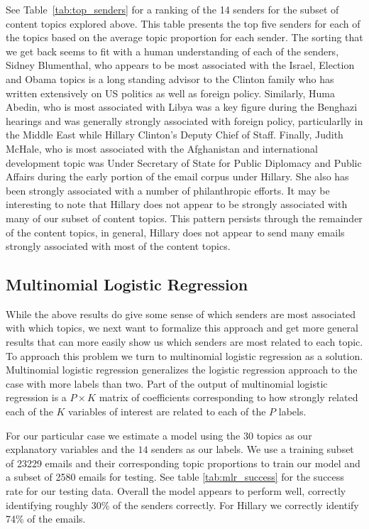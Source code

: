 \documentclass[12pt]{article}
\theoremstyle{definition}
\theoremstyle{algodesc}
\begin{document}
See Table~\ref{tab:top_senders} for a ranking of the 14 senders for the subset of content topics explored above.  This table presents the top five senders for each of the topics based on the average topic proportion for each sender.  The sorting that we get back seems to fit with a human understanding of each of the senders, Sidney Blumenthal, who appears to be most associated with the Israel, Election and Obama topics is a long standing advisor to the Clinton family who has written extensively on US politics as well as foreign policy.  Similarly, Huma Abedin, who is most associated with Libya was a key figure during the Benghazi hearings and was generally strongly associated with foreign policy, particularlly in the Middle East while Hillary Clinton's Deputy Chief of Staff.  Finally, Judith McHale, who is most associated with the Afghanistan and international development topic was Under Secretary of State for Public Diplomacy and Public Affairs during the early portion of the email corpus under Hillary.  She also has been strongly associated with a number of philanthropic efforts.  It may be interesting to note that Hillary does not appear to be strongly associated with many of our subset of content topics.  This pattern persists through the remainder of the content topics, in general, Hillary does not appear to send many emails strongly associated with most of the content topics.


\subsection{Multinomial Logistic Regression}
While the above results do give some sense of which senders are most associated with which topics, we next want to formalize this approach and get more general results that can more easily show us which senders are most related to each topic.  To approach this problem we turn to multinomial logistic regression as a solution.  Multinomial logistic regression generalizes the logistic regression approach to the case with more labels than two.  Part of the output of multinomial logistic regression is a $P \times K$ matrix of coefficients corresponding to how strongly related each of the $K$ variables of interest are related to each of the $P$ labels.

For our particular case we estimate a model using the $30$ topics as our explanatory variables and the $14$ senders as our labels.  We use a training subset of 23229 emails and their corresponding topic proportions to train our model and a subset of 2580 emails for testing.  See table \ref{tab:mlr_success} for the success rate for our testing data.  Overall the model appears to perform well, correctly identifying roughly 30\% of the senders correctly.  For Hillary we correctly identify 74\% of the emails.
\end{document}
